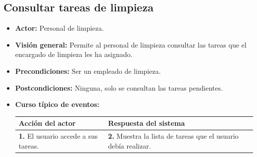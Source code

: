 \documentclass[spanish,a4paper,11pt, twoside]{report}	%
\begin{document}

	\hspace{1 true cm}
	\subsection{Consultar tareas de limpieza}				
			\begin{itemize}
				\item \textbf{Actor:} Personal de limpieza.
				\item \textbf{Visión general:} Permite al personal de limpieza consultar las tareas que el encargado de limpieza les ha asignado. 		
			\item \textbf{Precondiciones:} Ser un empleado de limpieza.
			\item \textbf{Postcondiciones:}  Ninguna, solo se consultan las tareas pendientes.
			\item \textbf{Curso típico de eventos:}\\ 
				\begin{tabular}{|p{6cm}||p{6cm}|}
					\hline
					\textbf{Acción del actor} & \textbf{Respuesta del sistema} \\ \hline \hline
					\textbf{1.} El usuario accede a sus tareas. & \textbf{2.} Muestra la lista de tareas que el usuario debía realizar.\\ \hline 
				\end{tabular}
			\end {itemize}


	
\end{document}
